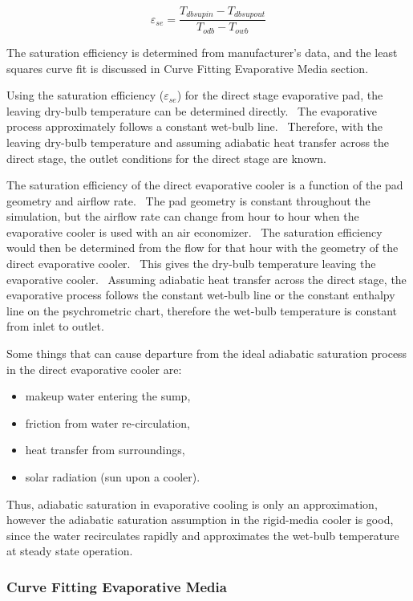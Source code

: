 \begin{equation}
{\varepsilon_{se}} = \frac{{{T_{dbsupin}} - {T_{dbsupout}}}}{{{T_{odb}} - {T_{owb}}}}
\end{equation}

The saturation efficiency is determined from manufacturer's data, and the least squares curve fit is discussed in Curve Fitting Evaporative Media section.

Using the saturation efficiency (\(\varepsilon_{se}\)) for the direct stage evaporative pad, the leaving dry-bulb temperature can be determined directly.~ The evaporative process approximately follows a constant wet-bulb line.~ Therefore, with the leaving dry-bulb temperature and assuming adiabatic heat transfer across the direct stage, the outlet conditions for the direct stage are known.

The saturation efficiency of the direct evaporative cooler is a function of the pad geometry and airflow rate.~ The pad geometry is constant throughout the simulation, but the airflow rate can change from hour to hour when the evaporative cooler is used with an air economizer.~ The saturation efficiency would then be determined from the flow for that hour with the geometry of the direct evaporative cooler.~ This gives the dry-bulb temperature leaving the evaporative cooler.~ Assuming adiabatic heat transfer across the direct stage, the evaporative process follows the constant wet-bulb line or the constant enthalpy line on the psychrometric chart, therefore the wet-bulb temperature is constant from inlet to outlet.

Some things that can cause departure from the ideal adiabatic saturation process in the direct evaporative cooler are:

\begin{itemize}
\item makeup water entering the sump,
\item friction from water re-circulation,
\item heat transfer from surroundings,
\item solar radiation (sun upon a cooler).
\end{itemize}

Thus, adiabatic saturation in evaporative cooling is only an approximation, however the adiabatic saturation assumption in the rigid-media cooler is good, since the water recirculates rapidly and approximates the wet-bulb temperature at steady state operation.

\subsubsection{Curve Fitting Evaporative Media}\label{curve-fitting-evaporative-media}

